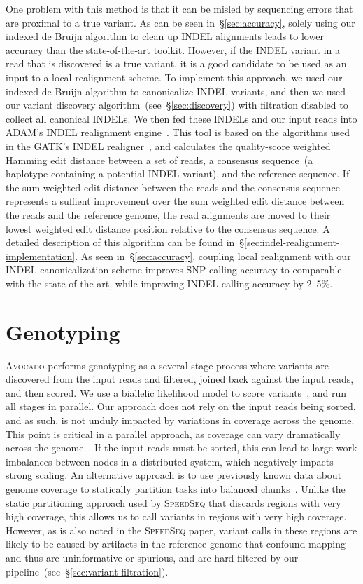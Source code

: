 \documentclass[phd]{ucbthesis}
\begin{document}
One problem with this method is that it can be misled by sequencing errors
that are proximal to a true variant. As can be seen in~\S\ref{sec:accuracy},
solely using our indexed de Bruijn algorithm to clean up INDEL alignments leads
to lower accuracy than the state-of-the-art toolkit. However, if the INDEL
variant in a read that is discovered is a true variant, it is a good candidate
to be used as an input to a local realignment scheme.  To implement this
approach, we used our indexed de Bruijn algorithm to canonicalize INDEL variants,
and then we used our variant discovery algorithm~(see~\S\ref{sec:discovery})
with filtration disabled to collect all canonical INDELs. We then fed these
INDELs and our input reads into \textsc{ADAM}'s INDEL realignment
engine~\cite{massie13, nothaft15}. This tool is based on the algorithms used in
the \textsc{GATK}'s INDEL realigner~\cite{depristo11}, and calculates the quality-score
weighted Hamming edit distance between a set of reads, a consensus sequence~(a
haplotype containing a potential INDEL variant), and the reference sequence. If
the sum weighted edit distance between the reads and the consensus sequence
represents a suffient improvement over the sum weighted edit distance between
the reads and the reference genome, the read alignments are moved to their
lowest weighted edit distance position relative to the consensus sequence.
A detailed description of this algorithm can be found in~\S\ref{sec:indel-realignment-implementation}.
As seen in~\S\ref{sec:accuracy}, coupling local realignment with our INDEL
canonicalization scheme improves SNP calling accuracy to comparable with the
state-of-the-art, while improving INDEL calling accuracy by 2--5\%.

\section{Genotyping}
\label{sec:genotyping}

\textsc{Avocado} performs genotyping as a several stage process where variants
are discovered from the input reads and filtered, joined back against the input
reads, and then scored. We use a biallelic likelihood model to score
variants~\cite{li11}, and run all stages in parallel. Our approach does not
rely on the input reads being sorted, and as such, is not unduly impacted by
variations in coverage across the genome. This point is critical in a parallel
approach, as coverage can vary dramatically across the genome~\cite{pinard06}.
If the input reads must be sorted, this can lead to large work imbalances
between nodes in a distributed system, which negatively impacts strong scaling.
An alternative approach is to use previously known data about genome coverage
to statically partition tasks into balanced chunks~\cite{chiang15}. Unlike the
static partitioning approach used by \textsc{SpeedSeq} that discards regions with
very high coverage, this allows us to call variants in regions with very high
coverage. However, as is also noted in the \textsc{SpeedSeq} paper, variant calls
in these regions are likely to be caused by artifacts in the reference genome that
confound mapping and thus are uninformative or spurious, and are hard filtered by
our pipeline~(see~\S\ref{sec:variant-filtration}).
\end{document}

